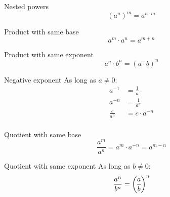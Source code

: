 \begin{multicols}{2}
 \begin{FormulaBox}{Nested powers}
  \begin{equation*}
   (a^n)^m = a^{n \cdot m}
  \end{equation*}
 \end{FormulaBox}

 \begin{FormulaBox}{Product with same base}
  \begin{equation*}
   a^m \cdot a^n = a^{m+n}
  \end{equation*}
 \end{FormulaBox}

 \begin{FormulaBox}{Product with same exponent}
  \begin{equation*}
   a^n \cdot b^n = (a \cdot b)^n
  \end{equation*}
 \end{FormulaBox}

 \begin{FormulaBox}{Negative exponent}
  As long as $a \neq 0$:
  \begin{equation*}
   \begin{split}
     a^{-1} &= \frac{1}{a}
     \\
     a^{-n} &= \frac{1}{a^n}
     \\
     \frac{c}{a^n} &= c \cdot a^{-n}
     \\
   \end{split}
  \end{equation*}
 \end{FormulaBox}

 \begin{FormulaBox}{Quotient with same base}
  \begin{equation*}
   \frac{a^m}{a^n} = a^m \cdot a^{-n} = a^{m-n}
  \end{equation*}
 \end{FormulaBox}

 \begin{FormulaBox}{Quotient with same exponent}
  As long as $b \neq 0$:
  \begin{equation*}
   \frac{a^n}{b^n} = \pfrac{a}{b}^n
  \end{equation*}
 \end{FormulaBox}

\end{multicols}

